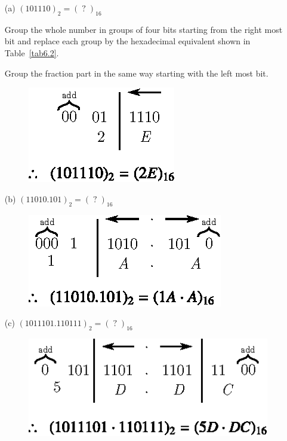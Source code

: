 \begin{solution}
\begin{itemize}
\item[(a)] $(101110)_{2}=(\;?\;)_{16}$

Group the whole number in groups of four bits starting from the right most bit and replace each group by the hexadecimal equivalent shown in Table~\ref{tab6.2}.

Group the fraction part in the same way starting with the left most bit.
\begin{figure}[H]
\centering
\includegraphics[scale=1.1]{chap6/fig21.eps}
\end{figure}

\item[(b)] $(11010.101)_{2}=(\;?\;)_{16}$
\begin{figure}[H]
\centering
\includegraphics[scale=1.1]{chap6/fig22.eps}
\end{figure}

\item[(c)] $(1011101.110111)_{2}=(\;?\;)_{16}$
\begin{figure}[H]
\centering
\includegraphics[scale=1.1]{chap6/fig23.eps}
\end{figure}
\end{itemize}
\vskip -1cm
\end{solution}

